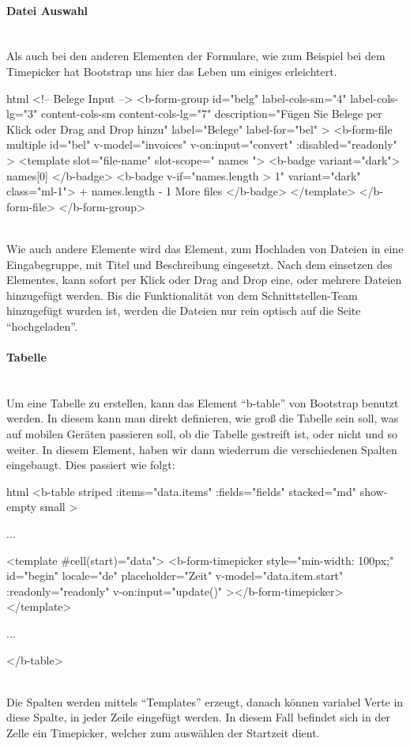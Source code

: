 \paragraph{Datei Auswahl}
~\\
Als auch bei den anderen Elementen der Formulare, wie zum Beispiel bei dem Timepicker hat Bootstrap uns hier das Leben um einiges erleichtert. 
\begin{code}{html}
	<!-- Belege Input -->
	<b-form-group
	  id="belg"
	  label-cols-sm="4"
	  label-cols-lg="3"
	  content-cols-sm
	  content-cols-lg="7"
	  description="Fügen Sie Belege per Klick oder Drag and Drop hinzu"
	  label="Belege"
	  label-for="bel"
	>
	  <b-form-file
		multiple
		id="bel"
		v-model="invoices"
		v-on:input="convert"
		:disabled="readonly"
	  >
		<template slot="file-name" slot-scope="{ names }">
		  <b-badge variant="dark">{{ names[0] }}</b-badge>
		  <b-badge v-if="names.length > 1" variant="dark" class="ml-1">
			+ {{ names.length - 1 }} More files
		  </b-badge>
		</template>
	  </b-form-file>
	</b-form-group>
\end{code}
	\label{list:dateiselect} ~\\
Wie auch andere Elemente wird das Element, zum Hochladen von Dateien in eine Eingabegruppe, mit Titel und Beschreibung eingesetzt. Nach dem einsetzen des Elementes, kann sofort per Klick oder Drag and Drop eine, oder mehrere Dateien hinzugefügt werden. Bis die Funktionalität von dem Schnittstellen-Team hinzugefügt wurden ist, werden die Dateien nur rein optisch auf die Seite \enquote{hochgeladen}. 
\paragraph{Tabelle}
~\\
Um eine Tabelle zu erstellen, kann das Element \enquote{b-table} von Bootstrap benutzt werden. In diesem kann man direkt definieren, wie groß die Tabelle sein soll, was auf mobilen Geräten passieren soll, ob die Tabelle gestreift ist, oder nicht und so weiter. In diesem Element, haben wir dann wiederrum die verschiedenen Spalten eingebaugt. Dies passiert wie folgt:
\begin{code}{html}
	<b-table
          striped
          :items="data.items"
          :fields="fields"
          stacked="md"
          show-empty
          small
    >

		...

		<template #cell(start)="data">
			<b-form-timepicker
				style="min-width: 100px;"
				id="begin"
				locale="de"
				placeholder="Zeit"
				v-model="data.item.start"
				:readonly="readonly"
				v-on:input="update()"
			></b-form-timepicker>
		</template>

		...

	</b-table>
\end{code}
	\label{list:bsptable} ~\\
Die Spalten werden mittels \enquote{Templates} erzeugt, danach können variabel Verte in diese Spalte, in jeder Zeile eingefügt werden. In diesem Fall befindet sich in der Zelle ein Timepicker, welcher zum auswählen der Startzeit dient.
\newpage
